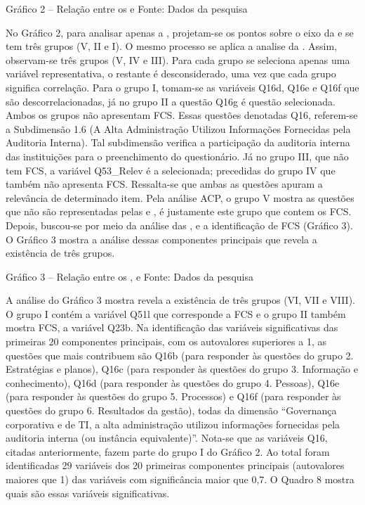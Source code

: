 Gráfico 2 – Relação entre os  e  
Fonte: Dados da pesquisa

No Gráfico 2, para analisar apenas a , projetam-se os pontos sobre o eixo da e se tem três grupos (V, II e I). O mesmo processo se aplica a analise da . Assim, observam-se três grupos (V, IV e III). Para cada grupo se seleciona apenas uma variável representativa, o restante é desconsiderado, uma vez que cada grupo significa correlação.
Para o grupo I, tomam-se as variáveis Q16d, Q16e e Q16f que são descorrelacionadas, já no grupo II a questão Q16g é questão selecionada. Ambos os grupos não apresentam FCS. Essas questões denotadas Q16, referem-se a Subdimensão 1.6 (A Alta Administração Utilizou Informações Fornecidas pela Auditoria Interna). Tal subdimensão verifica a participação da auditoria interna das instituições para o preenchimento do questionário. 
Já no grupo III, que não tem FCS, a variável Q53_Relev é a selecionada; precedidas do grupo IV que também não apresenta FCS. Ressalta-se que ambas as questões apuram a relevância de determinado item. Pela análise ACP, o grupo V mostra as questões que não são representadas pelas  e , é justamente este grupo que contem os FCS.
Depois, buscou-se por meio da análise das ,  e a identificação de FCS (Gráfico 3). O Gráfico 3 mostra a análise dessas componentes principais que revela a existência de três grupos. 


Gráfico 3 – Relação entre os ,  e 
Fonte: Dados da pesquisa

A análise do Gráfico 3 mostra revela a existência de três grupos (VI, VII e VIII). O grupo I contém a variável Q51l que corresponde a FCS e o grupo II também mostra FCS, a variável Q23b.
Na identificação das variáveis significativas das primeiras 20 componentes principais, com os autovalores superiores a 1, as questões que mais contribuem são Q16b (para responder às questões do grupo 2. Estratégias e planos), Q16c (para responder às questões do grupo 3. Informação e conhecimento), Q16d (para responder às questões do grupo 4. Pessoas), Q16e (para responder às questões do grupo 5. Processos) e Q16f (para responder às questões do grupo 6. Resultados da gestão), todas da dimensão “Governança corporativa e de TI, a alta administração utilizou informações fornecidas pela auditoria interna (ou instância equivalente)”. Nota-se que as variáveis Q16, citadas anteriormente, fazem parte do grupo I do Gráfico 2. Ao total foram identificadas 29 variáveis dos 20 primeiras componentes principais (autovalores maiores que 1) das variáveis com significância maior que 0,7. O Quadro 8 mostra quais são essas variáveis significativas. 

